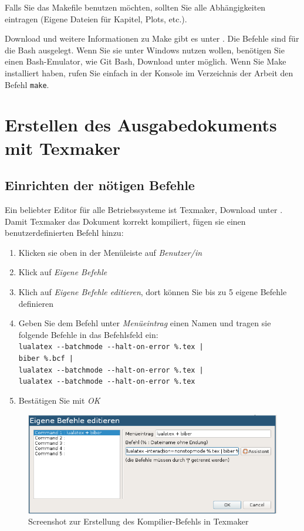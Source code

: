 Falls Sie das Makefile benutzen möchten, sollten Sie alle Abhängigkeiten eintragen (Eigene Dateien für Kapitel, Plots, etc.).


Download und weitere Informationen zu Make gibt es unter \cite{make}. Die Befehle sind für die Bash ausgelegt.
Wenn Sie sie unter Windows nutzen wollen, benötigen Sie einen Bash-Emulator, wie Git Bash, Download unter \cite{gitbash} möglich.
Wenn Sie Make installiert haben, rufen Sie einfach in der Konsole im Verzeichnis der Arbeit den Befehl \texttt{make}.

\section{Erstellen des Ausgabedokuments mit Texmaker}
\subsection{Einrichten der nötigen Befehle}
Ein beliebter Editor für alle Betriebssysteme ist Texmaker, Download unter \cite{texmaker}.
Damit Texmaker das Dokument korrekt kompiliert, fügen sie einen benutzerdefinierten Befehl hinzu:
\begin{enumerate}[nosep]
    \item Klicken sie oben in der Menüleiste auf \emph{Benutzer/in}
    \item Klick auf \emph{Eigene Befehle}
    \item Klich auf \emph{Eigene Befehle editieren}, dort können Sie bis zu 5 eigene Befehle definieren
    \item Geben Sie dem Befehl unter \emph{Menüeintrag} einen Namen und tragen sie folgende Befehle in das Befehlsfeld ein: \\
      \verb+lualatex --batchmode --halt-on-error %.tex |+ \\
          \verb+biber %.bcf |+ \\
          \verb+lualatex --batchmode --halt-on-error %.tex |+ \\
          \verb+lualatex --batchmode --halt-on-error %.tex+ 
    \item Bestätigen Sie mit \emph{OK}
\end{enumerate}

\begin{figure}
    \centering
    \includegraphics[width=12cm]{Plots/texmaker.png}
    \caption{Screenshot zur Erstellung des Kompilier-Befehls in Texmaker}
    \label{fig:texmaker}
\end{figure}


